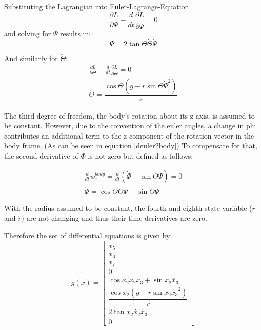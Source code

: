 Substituting the Lagrangian into Euler-Lagrange-Equation 
\begin{equation} \frac{\partial L}{\partial \Psi}-\frac{d}{dt}\frac{\partial L}{\partial \dot{\Psi}}=0 \end{equation}
and solving for $\ddot{\Psi}$ results in:
\begin{equation} \ddot{\Psi}=2\tan{\Theta}\dot{\Theta}\dot{\Psi} \end{equation}

And similarly for $\ddot{\Theta}$:
\begin{eqnarray} \frac{\partial L}{\partial \Theta}-\frac{d}{dt}\frac{\partial L}{\partial \dot{\Theta}}=0 \\
 \ddot{\Theta}=\dfrac{\cos{\Theta}(g-r\sin{\Theta}\dot{\Psi}^2)}{r} \end{eqnarray}

The third degree of freedom, the body's rotation about its z-axis, is assumed to be constant. However, due to the convention of the euler angles, a change in phi contributes an additional term to the z component of the rotation vector in the body frame. (As can be seen in equation \ref{deuler2body}) To compensate for that, the second derivative of $\Phi$ is not zero but defined as follows: 

\begin{eqnarray} \frac{d}{dt}w_{z}^{body}=\frac{d}{dt}(\dot{\Phi} - \sin{\Theta} \dot{\Psi}) =0 \\
 \ddot{\Phi}=\cos{\Theta}\dot{\Theta}\dot{\Psi}+\sin{\Theta}\ddot{\Psi} \end{eqnarray}

With the radius assumed to be constant, the fourth and eighth state variable ($r$ and $\dot{r}$) are not changing and thus their time derivatives are zero.

Therefore the set of differential equations is given by:
\begin{equation} g(x)=\begin{bmatrix} \\ x_{5} \\ x_{6} \\ x_{7} \\ 0 \\ \cos{x_{2}} \dot{x_{2}} \dot{x_{3}}+\sin{x_{2}} \ddot{x_{3}} \\  \dfrac{\cos{x_{2}}(g-r\sin{x_{2}} \dot{x_{3}}^2)}{r} \\ 2\tan{x_{2}} \dot{x_{2}} \dot{x_{3}} \\ 0  \end{bmatrix} \end{equation}

